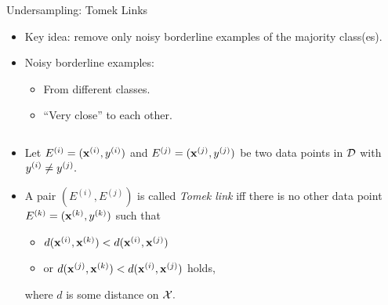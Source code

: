 \documentclass[11pt,compress,t,notes=noshow, xcolor=table]{beamer}
\begin{document}
	\begin{frame}{Undersampling: Tomek Links}
		\footnotesize{

        \begin{itemize}            
            \item Key idea: remove only noisy borderline examples of the majority class(es).
            \item Noisy borderline examples:
            \begin{itemize}
                \footnotesize
                \item From different classes.
                \item ``Very close'' to each other.
            \end{itemize} 
                
        \end{itemize}
        \begin{columns}
            \begin{column}{0.5\textwidth}	
        
                \begin{itemize}
                    \item Let $E^{(i)} = (\mathbf{x}^{(i)},y^{(i)})$ and $E^{(j)} = (\mathbf{x}^{(j)},y^{(j)})$ be two data points in $\mathcal{D}$ with $y^{(i)}\neq y^{(j)}.$
                    \vspace{10pt}
                    
                    \item A pair $(E^{(i)},E^{(j)})$ is called \emph{Tomek link} iff there is no other data point $E^{(k)} = (\mathbf{x}^{(k)},y^{(k)})$ such that
    
                    \begin{itemize} 
                    \footnotesize
                
                       \item [] $d(\mathbf{x}^{(i)}, \mathbf{x}^{(k)}) < d(\mathbf{x}^{(i)}, \mathbf{x}^{(j)}) $
                       \item [] or $d(\mathbf{x}^{(j)}, \mathbf{x}^{(k)}) < d(\mathbf{x}^{(i)}, \mathbf{x}^{(j)}) $ holds,
                    
                    \end{itemize}
    
                where $d$ is some distance on $\mathcal{X}.$
                
                \end{itemize}		
            \end{column}


\end{columns}}
\end{frame}
\end{document}
